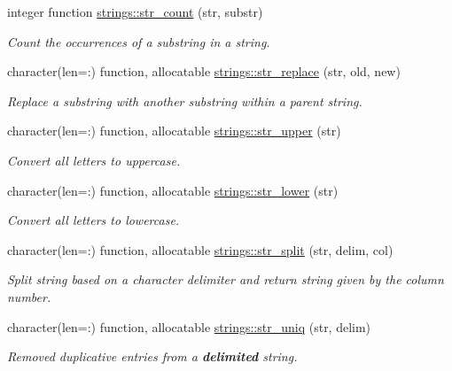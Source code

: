 \begin{DoxyCompactItemize}
\item 
integer function \mbox{\hyperlink{namespacestrings_a1b755da0409a70ccc4c25c1de4e7e009}{strings\+::str\+\_\+count}} (str, substr)
\begin{DoxyCompactList}\small\item\em Count the occurrences of a substring in a string. \end{DoxyCompactList}\item 
character(len=\+:) function, allocatable \mbox{\hyperlink{namespacestrings_a2d557ee85358067ac58c78aeda61fefc}{strings\+::str\+\_\+replace}} (str, old, new)
\begin{DoxyCompactList}\small\item\em Replace a substring with another substring within a parent string. \end{DoxyCompactList}\item 
character(len=\+:) function, allocatable \mbox{\hyperlink{namespacestrings_afd1c79d1ba7dfe3ca9c77cab4f936c99}{strings\+::str\+\_\+upper}} (str)
\begin{DoxyCompactList}\small\item\em Convert all letters to uppercase. \end{DoxyCompactList}\item 
character(len=\+:) function, allocatable \mbox{\hyperlink{namespacestrings_a9c44648f65a85e1e78b5e1c75ea67619}{strings\+::str\+\_\+lower}} (str)
\begin{DoxyCompactList}\small\item\em Convert all letters to lowercase. \end{DoxyCompactList}\item 
character(len=\+:) function, allocatable \mbox{\hyperlink{namespacestrings_ae0ef0af953180efc5cbda255e58e521c}{strings\+::str\+\_\+split}} (str, delim, col)
\begin{DoxyCompactList}\small\item\em Split string based on a character delimiter and return string given by the column number. \end{DoxyCompactList}\item 
character(len=\+:) function, allocatable \mbox{\hyperlink{namespacestrings_a8a6ee3280b88b0c63aa79b8095bd20ef}{strings\+::str\+\_\+uniq}} (str, delim)
\begin{DoxyCompactList}\small\item\em Removed duplicative entries from a {\bfseries{delimited}} string. \end{DoxyCompactList}\item 

\end{DoxyCompactItemize}
